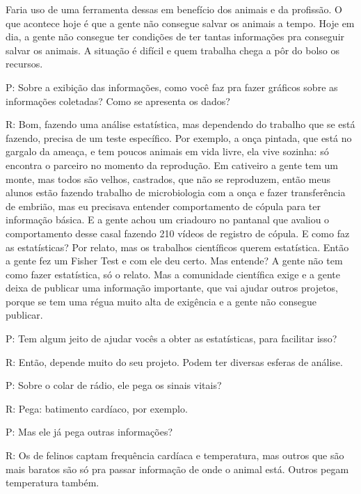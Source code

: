 Faria uso de uma ferramenta dessas em benefício dos animais e da profissão. O que acontece hoje é que a gente não consegue salvar os animais a tempo. Hoje em dia, a gente não consegue ter condições de ter tantas informações pra conseguir salvar os animais. A situação é difícil e quem trabalha chega a pôr do bolso os recursos.


P: Sobre a exibição das informações, como você faz pra fazer gráficos sobre as informações coletadas? Como se apresenta os dados?

R: Bom, fazendo uma análise estatística, mas dependendo do trabalho que se está fazendo, precisa de um teste específico. Por exemplo, a onça pintada, que está no gargalo da ameaça, e tem poucos animais em vida livre, ela vive sozinha: só encontra o parceiro no momento da reprodução. Em cativeiro a gente tem um monte, mas todos são velhos, castrados, que não se reproduzem, então meus alunos estão fazendo trabalho de microbiologia com a onça e fazer transferência de embrião, mas eu precisava entender comportamento de cópula para ter informação básica. E a gente achou um criadouro no pantanal que avaliou o comportamento desse casal fazendo 210 vídeos de registro de cópula. E como faz as estatísticas? Por relato, mas os trabalhos científicos querem estatística. Então a gente fez um Fisher Test e com ele deu certo. Mas entende? A gente não tem como fazer estatística, só o relato. Mas a comunidade científica exige e a gente deixa de publicar uma informação importante, que vai ajudar outros projetos, porque se tem uma régua muito alta de exigência e a gente não consegue publicar.

 
P: Tem algum jeito de ajudar vocês a obter as estatísticas, para facilitar isso?

R: Então, depende muito do seu projeto. Podem ter diversas esferas de análise.


P: Sobre o colar de rádio, ele pega os sinais vitais?

R: Pega: batimento cardíaco, por exemplo.


P: Mas ele já pega outras informações?

R: Os de felinos captam frequência cardíaca e temperatura, mas outros que são mais baratos são só pra passar informação de onde o animal está. Outros pegam temperatura também.